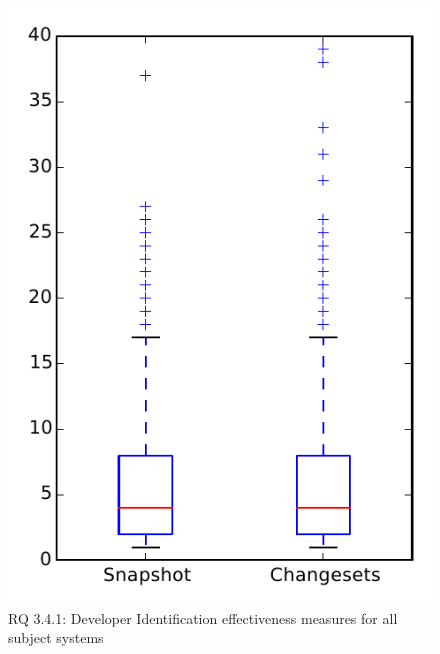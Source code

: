
\begin{figure}
\centering
\includegraphics[height=0.4\textheight]{figures/dit/rq1_overview}
\caption{RQ 3.4.1: Developer Identification effectiveness measures for all subject systems}
\label{fig:dit:rq1:overview}
\end{figure}
